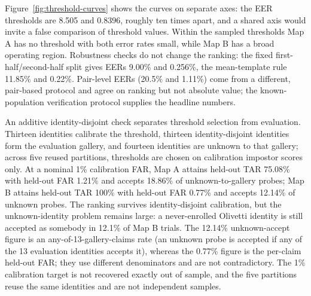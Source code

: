 Figure~\ref{fig:threshold-curves} shows the curves on separate axes: the EER thresholds are 8.505 and 0.8396, roughly ten times apart, and a shared axis would invite a false comparison of threshold values. Within the sampled thresholds Map A has no threshold with both error rates small, while Map B has a broad operating region. Robustness checks do not change the ranking: the fixed first-half/second-half split gives EERs 9.00\% and 0.256\%, the mean-template rule 11.85\% and 0.22\%. Pair-level EERs (20.5\% and 1.11\%) come from a different, pair-based protocol and agree on ranking but not absolute value; the known-population verification protocol supplies the headline numbers.

An additive identity-disjoint check separates threshold selection from evaluation. Thirteen identities calibrate the threshold, thirteen identity-disjoint identities form the evaluation gallery, and fourteen identities are unknown to that gallery; across five reused partitions, thresholds are chosen on calibration impostor scores only. At a nominal 1\% calibration FAR, Map A attains held-out TAR 75.08\% with held-out FAR 1.21\% and accepts 18.86\% of unknown-to-gallery probes; Map B attains held-out TAR 100\% with held-out FAR 0.77\% and accepts 12.14\% of unknown probes. The ranking survives identity-disjoint calibration, but the unknown-identity problem remains large: a never-enrolled Olivetti identity is still accepted as somebody in 12.1\% of Map B trials. The 12.14\% unknown-accept figure is an any-of-13-gallery-claims rate (an unknown probe is accepted if any of the 13 evaluation identities accepts it), whereas the 0.77\% figure is the per-claim held-out FAR; they use different denominators and are not contradictory. The 1\% calibration target is not recovered exactly out of sample, and the five partitions reuse the same identities and are not independent samples.


